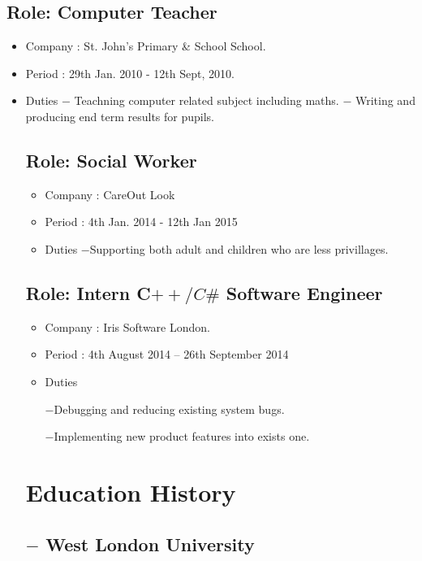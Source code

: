 \documentclass[11px]{article}
\begin{document}
  \subsection*{Role: Computer Teacher}
  \begin{itemize}
  	\item  Company : St. John's Primary \& School School.
  	\item Period   : 29th Jan. 2010  -  12th Sept, 2010.
  	\item Duties
  	$-$ Teachning computer related subject including maths.
  	$-$ Writing and producing end term results for pupils.
  	
  

  \subsection*{Role: Social Worker}
  \begin{itemize}
  	\item  Company : CareOut Look
  	\item Period   : 4th Jan. 2014  -  12th Jan 2015
  	\item Duties
  	   $-$Supporting both adult and children who are less privillages. 
  	
\end{itemize}

  \subsection*{Role: Intern C$++/C\#$ Software Engineer}
  \begin{itemize}
  	\item  Company :  Iris Software London.
  	\item Period   : 4th August 2014 – 26th September 2014
  	\item Duties
  	
       $-$Debugging and reducing  existing system bugs.
       
       $-$Implementing  new product features into exists one.
  \end{itemize}
  
 \hrulefill
\section*{Education History}
\subsection*{$-$ West London University}

\end{itemize}
\end{document}
